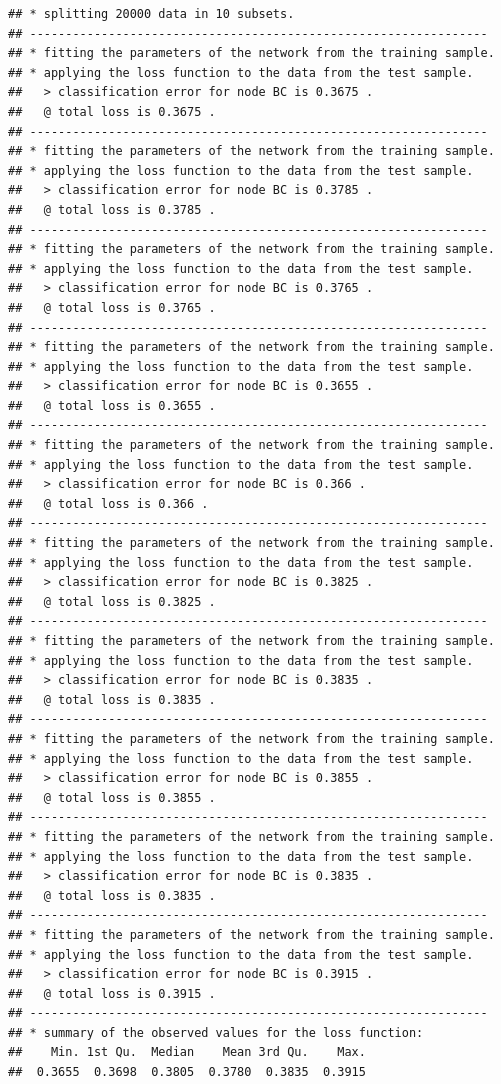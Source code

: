 \documentclass[]{article}
\begin{document}
\begin{verbatim}
## * splitting 20000 data in 10 subsets.
## ----------------------------------------------------------------
## * fitting the parameters of the network from the training sample.
## * applying the loss function to the data from the test sample.
##   > classification error for node BC is 0.3675 .
##   @ total loss is 0.3675 .
## ----------------------------------------------------------------
## * fitting the parameters of the network from the training sample.
## * applying the loss function to the data from the test sample.
##   > classification error for node BC is 0.3785 .
##   @ total loss is 0.3785 .
## ----------------------------------------------------------------
## * fitting the parameters of the network from the training sample.
## * applying the loss function to the data from the test sample.
##   > classification error for node BC is 0.3765 .
##   @ total loss is 0.3765 .
## ----------------------------------------------------------------
## * fitting the parameters of the network from the training sample.
## * applying the loss function to the data from the test sample.
##   > classification error for node BC is 0.3655 .
##   @ total loss is 0.3655 .
## ----------------------------------------------------------------
## * fitting the parameters of the network from the training sample.
## * applying the loss function to the data from the test sample.
##   > classification error for node BC is 0.366 .
##   @ total loss is 0.366 .
## ----------------------------------------------------------------
## * fitting the parameters of the network from the training sample.
## * applying the loss function to the data from the test sample.
##   > classification error for node BC is 0.3825 .
##   @ total loss is 0.3825 .
## ----------------------------------------------------------------
## * fitting the parameters of the network from the training sample.
## * applying the loss function to the data from the test sample.
##   > classification error for node BC is 0.3835 .
##   @ total loss is 0.3835 .
## ----------------------------------------------------------------
## * fitting the parameters of the network from the training sample.
## * applying the loss function to the data from the test sample.
##   > classification error for node BC is 0.3855 .
##   @ total loss is 0.3855 .
## ----------------------------------------------------------------
## * fitting the parameters of the network from the training sample.
## * applying the loss function to the data from the test sample.
##   > classification error for node BC is 0.3835 .
##   @ total loss is 0.3835 .
## ----------------------------------------------------------------
## * fitting the parameters of the network from the training sample.
## * applying the loss function to the data from the test sample.
##   > classification error for node BC is 0.3915 .
##   @ total loss is 0.3915 .
## ----------------------------------------------------------------
## * summary of the observed values for the loss function:
##    Min. 1st Qu.  Median    Mean 3rd Qu.    Max. 
##  0.3655  0.3698  0.3805  0.3780  0.3835  0.3915
\end{verbatim}
\end{document}
